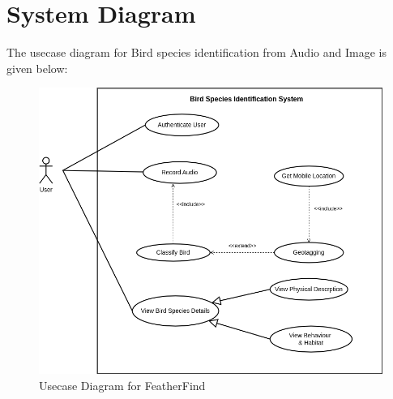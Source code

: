 \section{System Diagram}
The usecase diagram for Bird species identification from Audio and Image is
given below:
\begin{figure}[h!]
    \centering
    \includegraphics[scale=0.5]{images/usecase.png}
    \caption{Usecase Diagram for
        FeatherFind}%
\end{figure}

\newpage
